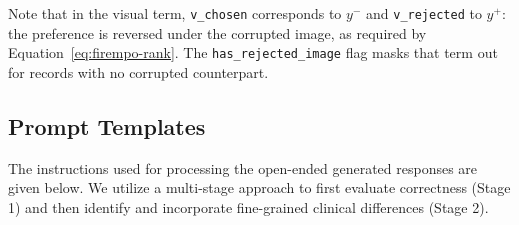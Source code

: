 Note that in the visual term, \texttt{v\_chosen} corresponds to $y^-$ and \texttt{v\_rejected} to $y^+$: the preference is reversed under the corrupted image, as required by Equation~\ref{eq:firempo-rank}. The \texttt{has\_rejected\_image} flag masks that term out for records with no corrupted counterpart.

\subsection{Prompt Templates}
\label{app:prompts}

The instructions used for processing the open-ended generated responses are given below. We utilize a multi-stage approach to first evaluate correctness (Stage 1) and then identify and incorporate fine-grained clinical differences (Stage 2).

